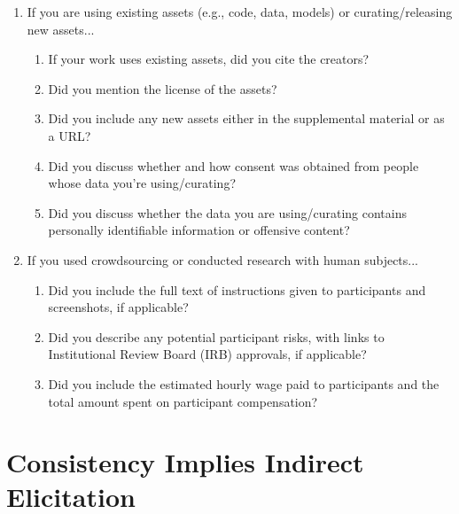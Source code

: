 \documentclass{article} %
\newcommand{\Comments}{0}
\newcommand{\mytodo}[2]{\ifnum\Comments=1%
	\todo[linecolor=#1!80!black,backgroundcolor=#1,bordercolor=#1!80!black]{#2}\fi}
\newcommand{\jessiet}[1]{\mytodo{teal!20!white}{JF: #1}}
\renewcommand{\L}{\mathcal{L}}
\begin{document}
\begin{enumerate}
	\item If you are using existing assets (e.g., code, data, models) or curating/releasing new assets...
	\begin{enumerate}
		\item If your work uses existing assets, did you cite the creators?
		\answerNA{}
		\item Did you mention the license of the assets?
		\answerNA{}
		\item Did you include any new assets either in the supplemental material or as a URL?
		\answerNA{}
		\item Did you discuss whether and how consent was obtained from people whose data you're using/curating?
		\answerNA{}
		\item Did you discuss whether the data you are using/curating contains personally identifiable information or offensive content?
		\answerNA{}
	\end{enumerate}
	
	\item If you used crowdsourcing or conducted research with human subjects...
	\begin{enumerate}
		\item Did you include the full text of instructions given to participants and screenshots, if applicable?
		\answerNA{}
		\item Did you describe any potential participant risks, with links to Institutional Review Board (IRB) approvals, if applicable?
		\answerNA{}
		\item Did you include the estimated hourly wage paid to participants and the total amount spent on participant compensation?
		\answerNA{}
	\end{enumerate}
	
\end{enumerate}
\newpage
\appendix
\section{Consistency Implies Indirect Elicitation}\label{sec:consis-implies-indir}


\end{document}
